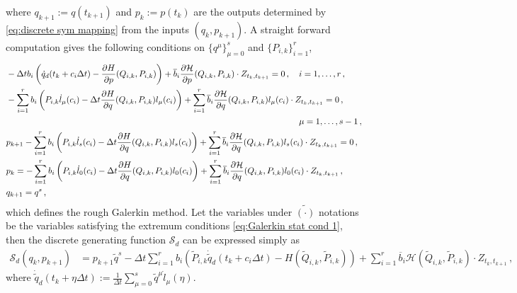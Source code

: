 \documentclass[11pt, oneside]{article}
\numberwithin{equation}{section}
\newtheorem{remark}{Remark}[section]
\theoremstyle{definition}
\newcommand{\ob}[1]{\overline{#1}}
\newcommand{\wt}[1]{\widetilde{#1}}
\newcommand{\mc}[1]{\mathcal{#1}}
\newcommand{\mcal}[1]{\mc{#1}}
\def\p{{\partial}}
\def\p{\partial}
\begin{document}
where $q_{k+1} := q(t_{k+1})$ and $ p_k:= p(t_k)$ are the outputs determined by \eqref{eq:discrete sym mapping} from the inputs $(q_k, p_{k+1})$. A straight forward computation gives the following conditions on $\{q^\mu\}_{\mu=0}^s$ and $\{P_{i,k}\}_{i=1}^r$,
\begin{subequations}\label{eq:Galerkin stat cond 1}
\begin{align}
    & - \Delta t b_i\left(\dot{q}_d(t_k + c_i\Delta t) - \frac{\p H}{\p p}(Q_{i,k}, P_{i,k})\right) + \ob{b}_i\frac{\p \mcal{H}}{\p p}(Q_{i,k}, P_{i,k})\cdot Z_{t_k, t_{k+1}} = 0\,,\quad i = 1,\ldots,r\,,\label{eq:galerkin stat 1}\\
    & -  \sum_{i=1}^r b_i\left( P_{i,k} \dot{l}_\mu(c_i) - \Delta t \frac{\p H}{\p q}(Q_{i,k}, P_{i,k})l_\mu(c_i)\right) + \sum_{i=1}^r \ob{b}_i\frac{\p \mcal{H}}{\p q}(Q_{i,k}, P_{i,k})l_\mu(c_i)\cdot Z_{t_k, t_{k+1}} = 0\,,\label{eq:galerkin stat 2}\\
    &\hspace{33em}\quad \mu=1,\ldots,s-1\,, \notag \\
    &p_{k+1} - \sum_{i=1}^r b_i\left( P_{i,k} \dot{l}_s(c_i) - \Delta t \frac{\p H}{\p q}(Q_{i,k}, P_{i,k})l_s(c_i)\right) + \sum_{i=1}^r \ob{b}_i\frac{\p \mcal{H}}{\p q}(Q_{i,k}, P_{i,k})l_s(c_i)\cdot Z_{t_k, t_{k+1}} = 0\,,\label{eq:galerkin stat 3}\\
    &p_k = - \sum_{i=1}^r b_i\left( P_{i,k} \dot{l}_0(c_i) - \Delta t \frac{\p H}{\p q}(Q_{i,k}, P_{i,k})l_0(c_i)\right) + \sum_{i=1}^r \ob{b}_i\frac{\p \mcal{H}}{\p q}(Q_{i,k}, P_{i,k})l_0(c_i)\cdot Z_{t_k, t_{k+1}} \,,\label{eq:galerkin stat 4}\\
    &q_{k+1} = q^s\,,\label{eq:galerkin stat 5}
\end{align}
\end{subequations}
which defines the rough Galerkin method. Let the variables under $\wt{(\cdot)}$ notations be the variables satisfying the extremum conditions \eqref{eq:Galerkin stat cond 1}, then the discrete generating function $\mcal{S}_d$ can be expressed simply as 
\begin{align*}
    \mcal{S}_d(q_k, p_{k+1})&= p_{k+1}\wt{q}^s - \Delta t \sum_{i=1}^r b_i\left( \wt{P}_{i,k} \dot{\wt{q}}_d(t_k + c_i \Delta t) - H(\wt{Q}_{i,k}, \wt{P}_{i,k})\right) + \sum_{i=1}^r \ob{b}_i\mcal{H}(\wt{Q}_{i,k}, \wt{P}_{i,k})\cdot Z_{t_k, t_{k+1}}\,,
\end{align*}
where $\dot{\wt{q}}_d(t_k + \eta \Delta t) := \frac{1}{\Delta t}\sum_{\mu=0}^s \wt{q}^\mu \dot{l}_\mu(\eta)$. 
\end{document}
